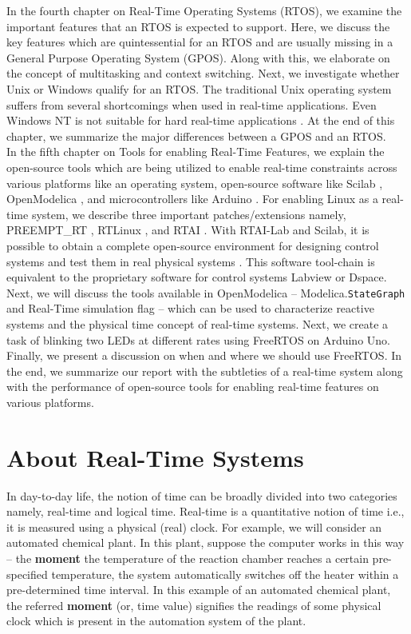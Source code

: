 \documentclass[12pt]{report}
\begin{document}
In the fourth chapter on Real-Time Operating Systems (RTOS), we examine the important features that an RTOS is expected to support. Here, we discuss the key features which are quintessential for an RTOS and are usually missing in a General Purpose Operating System (GPOS). Along with this, we elaborate on the concept of multitasking and context switching. Next, we investigate whether Unix or Windows qualify for an RTOS.  The traditional  Unix operating system suffers from several shortcomings when used in real-time applications. Even Windows NT is not suitable for hard real-time applications \cite{windowsnt-k}. At the end of this chapter, we summarize the major differences between a GPOS and an RTOS. \\

In the fifth chapter on Tools for enabling Real-Time Features, we explain the open-source tools which are being utilized to enable real-time constraints across various platforms like an operating system, open-source software like Scilab \cite{scilab}, OpenModelica \cite{OM}, and microcontrollers like Arduino \cite{arduino}. For enabling Linux as a real-time system, we describe three important patches/extensions namely, PREEMPT\_RT \cite{rtlinux}, RTLinux \cite{embd-rtlinux}, and RTAI \cite{real-time-cap}. With RTAI-Lab and Scilab,  it is possible to obtain a complete open-source environment for designing control systems and test them in real physical systems \cite{scilab-rtai}.  This software tool-chain is equivalent to the proprietary software for control systems Labview or Dspace. Next, we will discuss the tools available in OpenModelica – Modelica.\texttt{StateGraph} \cite{stategraph} and Real-Time simulation flag \cite{flags} – which can be used to characterize reactive systems and the physical time concept of real-time systems. Next, we create a task of blinking two LEDs at different rates using FreeRTOS \cite{freertos} on Arduino Uno. Finally, we present a discussion on when and where we should use FreeRTOS. In the end, we summarize our report with the subtleties of a real-time system along with the performance of open-source tools for enabling real-time features on various platforms. 
 
 
 \chapter{About Real-Time Systems}
In day-to-day life, the notion of time can be broadly divided into two categories namely, real-time and logical time. Real-time is a quantitative notion of time i.e., it is measured using a physical (real) clock. For example, we will consider an automated chemical plant. In this plant, suppose the computer works in this way -- the \textbf{moment} the temperature of the reaction chamber reaches a certain pre-specified temperature, the system automatically switches off the heater within a pre-determined time interval. In this example of an automated chemical plant, the referred \textbf{moment} (or, time value) signifies the readings of some physical clock which is present in the automation system of the plant.\\ 
\end{document}

